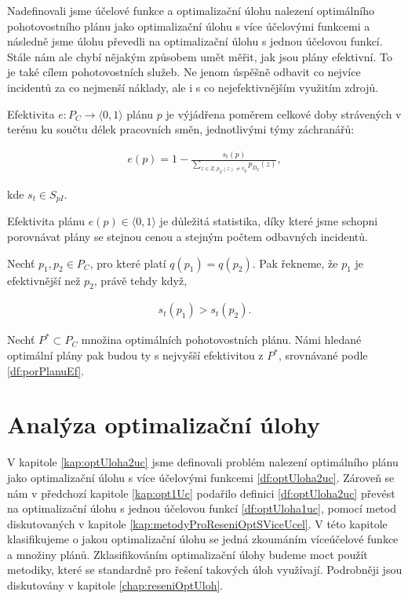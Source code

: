 Nadefinovali jsme účelové funkce a optimalizační úlohu nalezení optimálního pohotovostního plánu jako optimalizační úlohu s více účelovými funkcemi
a následně jsme úlohu převedli na optimalizační úlohu s jednou účelovou funkcí.
Stále nám ale chybí nějakým způsobem umět měřit, jak jsou plány efektivní.
To je také cílem pohotovostních služeb. Ne jenom úspěšně odbavit co nejvíce incidentů za co nejmenší náklady, ale i s co nejefektivnějším využitím zdrojů.

\begin{definice}\label{df:efPlanu}
  Efektivita $e \colon P_C \rightarrow \langle 0, 1 \rangle$ plánu $p$ je výjádřena poměrem celkové doby strávených v terénu ku součtu délek pracovních směn, jednotlivými týmy záchranářů:

  \begin{align*}
    e(p) = 1 - \frac{s_t(p)}{\sum_{z \in Z, p_Z(z) \neq v_{\emptyset}} p_{D_2}(z)},
  \end{align*}

  kde $s_t \in S_{pI}$.
\end{definice}

Efektivita plánu $e(p) \in \langle 0, 1 \rangle$ je důležitá statistika, díky které jsme schopni porovnávat plány se stejnou cenou a stejným počtem odbavných incidentů.

\begin{definice}\label{df:porPlanuEf}
  Nechť $p_1, p_2 \in P_C$, pro které platí $q(p_1) = q(p_2)$.
  Pak řekneme, že $p_1$ je efektivnější než $p_2$, právě tehdy když,

  \begin{align*}
    s_t(p_1) > s_t(p_2).
  \end{align*}
\end{definice}

\begin{definice}
  Nechť $P^* \subset P_C$ množina optimálních pohotovostních plánu. Námi hledané optimální plány pak budou ty s nejvyšší efektivitou z $P^*$, srovnávané podle \ref{df:porPlanuEf}.
\end{definice}

\section{Analýza optimalizační úlohy}

V kapitole \ref{kap:optUloha2uc} jsme definovali problém nalezení optimálního plánu jako optimalizační úlohu s více účelovými funkcemi \ref{df:optUloha2uc}.
Zároveň se nám v předchozí kapitole \ref{kap:opt1Uc} podařilo definici \ref{df:optUloha2uc} převést na optimalizační úlohu s jednou účelovou funkcí \ref{df:optUloha1uc},
pomocí metod diskutovaných v kapitole \ref{kap:metodyProReseniOptSViceUcel}.
V této kapitole klasifikujeme o jakou optimalizační úlohu se jedná zkoumáním víceúčelové funkce a množiny plánů.
Zklasifikováním optimalizační úlohy budeme moct použít metodiky, které se standardně pro řešení takových úloh využívají. 
Podrobněji jsou diskutovány v kapitole \ref{chap:reseniOptUloh}.

